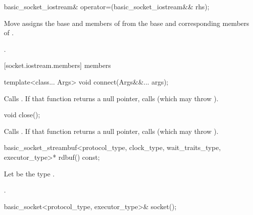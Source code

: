 \begin{itemdecl}
basic_socket_iostream& operator=(basic_socket_iostream&& rhs);
\end{itemdecl}

\begin{itemdescr}
\pnum
\effects Move assigns the base and members of  from the base and corresponding members of .

\pnum
\returns {}.
\end{itemdescr}



[socket.iostream.members]{ members}

\begin{itemdecl}
template<class... Args>
  void connect(Args&&... args);
\end{itemdecl}


\begin{itemdescr}
\pnum
\effects Calls . If that function returns a null pointer, calls  (which may throw ).
\end{itemdescr}

\begin{itemdecl}
void close();
\end{itemdecl}

\begin{itemdescr}
\pnum
\effects Calls . If that function returns a null pointer, calls  (which may throw ).
\end{itemdescr}

\begin{itemdecl}
basic_socket_streambuf<protocol_type, clock_type, wait_traits_type, executor_type>* rdbuf() const;
\end{itemdecl}

\begin{itemdescr}
\pnum
Let  be the type .

\pnum
\returns {}.
\end{itemdescr}

\begin{itemdecl}
basic_socket<protocol_type, executor_type>& socket();
\end{itemdecl}

